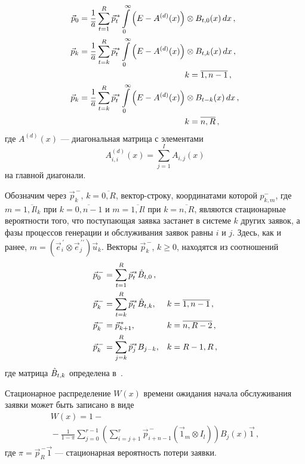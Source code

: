 \begin{multicols}{2}
\noindent
\begin{align}
\vec p_{0}  & = \frac{1}{\overline a} \sum\limits_{t=1}^{R} \vec p_t^{\,*} 
\int\limits_0^\infty
\left ( E-A^{(d)}(x)\right ) \otimes B_{t,0}(x)\, dx\,,\\
\vec p_{k} & = \frac{1}{\overline a} \sum\limits_{t=k}^{R} \vec p_t^{\,*} 
\int\limits_0^\infty
\left ( E-A^{(d)}(x)\right ) \otimes B_{t,k}(x)\, dx\,,\notag\\
&\ \ \ \ \ \ \ \ \ \ \ \ \ \ \ \ \ \ \ \ \ \ \ \ \ \ \ \ \ \ \ \ \ \ \ \ \ \  k =\overline{1,n-1}\,,\\
\label{p_3} \vec p_{k} & = \frac{1}{\overline a} \sum\limits_{t=k}^{R} \vec 
p_t^{\,*} \int\limits_0^\infty
\left ( E-A^{(d)}(x)\right ) \otimes B_{t-k}(x)\, dx\,,\notag\\
&\ \ \ \ \ \ \ \ \ \ \ \ \ \ \ \ \ \ \ \ \ \ \ \ \ \ \ \ \ \ \ \ \ \ \ \ \ \ k= \overline{n,R}\,,
\end{align}
где $A^{(d)}(x)$ --- диагональная матрица с элементами
$$
A_{i,i}^{(d)}(x) = \sum\limits_{j=1}^I A_{i,j}(x)
$$
на главной диагонали.

Обозначим через $\vec p_k^{\,-}$, $k=\overline{0,R}$, вектор-строку,
координатами которой
$p_{k,m}^{-}$, где $m=\overline{1,I l_k}$ при $k=\overline{0,n-1}$ и
$m=\overline{1,Il}$ при $k=\overline{n,R}$, являются стационарные
вероятности того,
что поступающая заявка застанет в системе $k$ других заявок, а фазы
процессов генерации и обслуживания заявок равны $i$ и $j$.
Здесь, как и ранее,
$m=(\vec e^{\,\prime}_i\otimes \vec e^{\,\prime\prime}_j) \vec u_k$.
Векторы $\vec p_k^{\,-}$, $k\ge 0$, находятся из соотношений
\begin{align}
\label{p-_1}
\vec p_0^{\,-} & =
\sum\limits_{t=1}^{R}
\vec p_t^{\,*} \Bar B_{t,0}\,, &&\\
\vec p_k^{\,-} & =
\sum\limits_{t=k}^{R}
\vec p_t^{\,*} \Bar B_{t,k},
& k & =\overline{1,n-1}\,,\\
\vec p_k^{\,-} &=\vec p_{k+1}^{\,*}, & k & =\overline{n,R-2}\,,\\
\label{p-_4} \vec p^{\,-}_k & =
\sum\limits_{j=k}^{R} \vec p_{j}^{\,*}
B_{j-k}, & k & = R-1,R\,,
\end{align}
где матрица $\Bar B_{t,k}$ определена в~\cite{PSCh06}.

Стационарное распределение $W(x)$ времени ожидания начала обслуживания
заявки может быть записано в виде
\begin{multline}
\label{w_x}
\!\!\!W(x) =1-{}\\
\!\!{}-\frac{1}{1-\pi} \sum\limits_{j=0}^{r-1} \left( \sum\limits_{i=j+1}^{r} 
\vec p^{\,-}_{i+n-1} \left ( \vec 1_m \otimes I_l\right ) \right) B_j (x){\vec 
1}\,, \!\!
\end{multline}
где $\pi =\vec p^{\,-}_{R} {\vec 1}$ --- стационарная вероятность
потери заявки.


\end{multicols}
